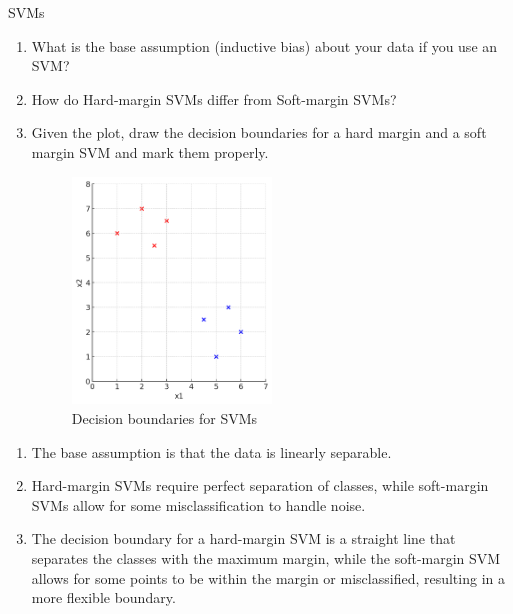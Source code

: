 \documentclass{article}
\begin{document}
\begin{exercise}{SVMs}
  \begin{enumerate}
    \item What is the base assumption (inductive bias) about your data if you use an SVM?
    \item How do Hard-margin SVMs differ from Soft-margin SVMs?
    \item Given the plot, draw the decision boundaries for a hard margin and a soft margin SVM and mark them properly.
      \begin{figure}
        \centering
        \includegraphics[width=0.5\textwidth]{res/svm_decision_boundary.png}
        \caption{Decision boundaries for SVMs}
        \label{fig:svm_decision_boundary}
      \end{figure}
  \end{enumerate}

  \begin{solution}
    \begin{enumerate}
      \item The base assumption is that the data is linearly separable.
      \item Hard-margin SVMs require perfect separation of classes, while soft-margin SVMs allow for some misclassification to handle noise.
      \item The decision boundary for a hard-margin SVM is a straight line that separates the classes with the maximum margin, while the soft-margin SVM allows for some points to be within the margin or misclassified, resulting in a more flexible boundary.
    \end{enumerate}
  \end{solution}
\end{exercise}
\end{document}
